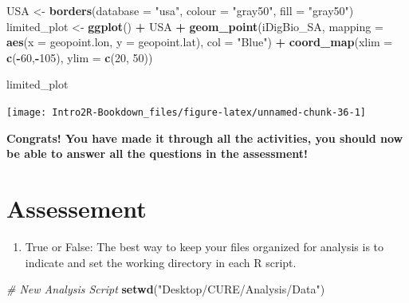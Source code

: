 \documentclass[
]{book}
\newenvironment{Shaded}{\begin{snugshade}}{\end{snugshade}}
\newcommand{\CommentTok}[1]{\textcolor[rgb]{0.56,0.35,0.01}{\textit{#1}}}
\newcommand{\DataTypeTok}[1]{\textcolor[rgb]{0.13,0.29,0.53}{#1}}
\newcommand{\DecValTok}[1]{\textcolor[rgb]{0.00,0.00,0.81}{#1}}
\newcommand{\KeywordTok}[1]{\textcolor[rgb]{0.13,0.29,0.53}{\textbf{#1}}}
\newcommand{\NormalTok}[1]{#1}
\newcommand{\OperatorTok}[1]{\textcolor[rgb]{0.81,0.36,0.00}{\textbf{#1}}}
\newcommand{\StringTok}[1]{\textcolor[rgb]{0.31,0.60,0.02}{#1}}
\providecommand{\tightlist}{%
  \setlength{\itemsep}{0pt}\setlength{\parskip}{0pt}}
\begin{document}
\begin{Shaded}
\begin{Highlighting}[]
\NormalTok{USA \textless{}{-}}\StringTok{ }\KeywordTok{borders}\NormalTok{(}\DataTypeTok{database =} \StringTok{"usa"}\NormalTok{, }\DataTypeTok{colour =} \StringTok{"gray50"}\NormalTok{, }\DataTypeTok{fill =} \StringTok{"gray50"}\NormalTok{) }
\NormalTok{limited\_plot \textless{}{-}}\StringTok{ }\KeywordTok{ggplot}\NormalTok{() }\OperatorTok{+}
\StringTok{                }\NormalTok{USA }\OperatorTok{+}
\StringTok{                }\KeywordTok{geom\_point}\NormalTok{(iDigBio\_SA,}
                           \DataTypeTok{mapping =} \KeywordTok{aes}\NormalTok{(}\DataTypeTok{x =}\NormalTok{ geopoint.lon, }\DataTypeTok{y =}\NormalTok{ geopoint.lat), }
                           \DataTypeTok{col =} \StringTok{"Blue"}\NormalTok{) }\OperatorTok{+}
\StringTok{                }\KeywordTok{coord\_map}\NormalTok{(}\DataTypeTok{xlim =} \KeywordTok{c}\NormalTok{(}\OperatorTok{{-}}\DecValTok{60}\NormalTok{,}\OperatorTok{{-}}\DecValTok{105}\NormalTok{), }\DataTypeTok{ylim =} \KeywordTok{c}\NormalTok{(}\DecValTok{20}\NormalTok{, }\DecValTok{50}\NormalTok{))}
            
\NormalTok{limited\_plot}
\end{Highlighting}
\end{Shaded}

\begin{center}\texttt{[image: Intro2R-Bookdown\_files/figure-latex/unnamed-chunk-36-1]} \end{center}

\textbf{Congrats! You have made it through all the activities, you should now be able to answer all the questions in the assessment!}

\hypertarget{assessement}{%
\chapter{Assessement}\label{assessement}}

\begin{enumerate}
\def\labelenumi{\arabic{enumi}.}
\tightlist
\item
  True or False: The best way to keep your files organized for analysis is to indicate and set the working directory in each R script.
\end{enumerate}

\begin{Shaded}
\begin{Highlighting}[]
\CommentTok{\# New Analysis Script }
\KeywordTok{setwd}\NormalTok{(}\StringTok{"Desktop/CURE/Analysis/Data"}\NormalTok{)}
\end{Highlighting}
\end{Shaded}
\end{document}
